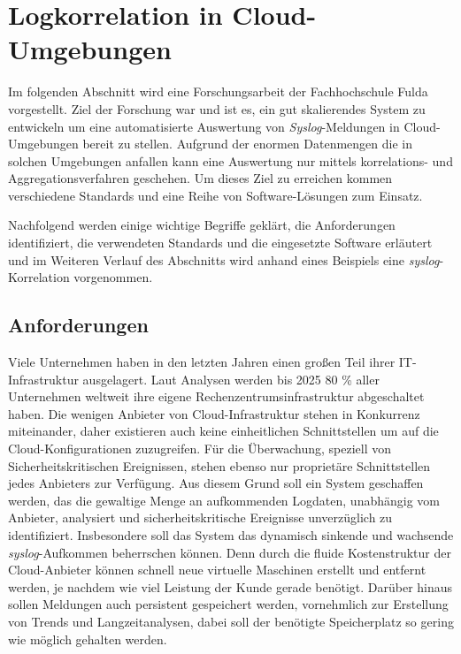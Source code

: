 \chapter{Logkorrelation in Cloud-Umgebungen}\label{02_jcorrelat}
\thispagestyle{fancy}

Im folgenden Abschnitt wird eine Forschungsarbeit der Fachhochschule Fulda 
\cite{reissmann} vorgestellt. Ziel der Forschung war und ist es, ein gut skalierendes 
System zu entwickeln um eine automatisierte Auswertung von \textit{Syslog}-Meldungen in 
Cloud-Umgebungen bereit zu stellen. Aufgrund der enormen Datenmengen die in solchen 
Umgebungen anfallen kann eine Auswertung nur mittels korrelations- und 
Aggregationsverfahren geschehen. Um dieses Ziel zu erreichen kommen verschiedene 
Standards und eine Reihe von Software-Lösungen zum Einsatz.

Nachfolgend werden einige wichtige Begriffe geklärt, die Anforderungen identifiziert, die 
verwendeten Standards und die eingesetzte Software erläutert und im Weiteren Verlauf des 
Abschnitts wird anhand eines Beispiels eine \textit{syslog}-Korrelation vorgenommen.

\section{Anforderungen}\label{anforderungen}

Viele Unternehmen haben in den letzten Jahren einen großen Teil ihrer IT-Infrastruktur 
ausgelagert. Laut Analysen werden bis 2025 80 \% aller Unternehmen \cite{web_ix} 
weltweit ihre eigene Rechenzentrumsinfrastruktur abgeschaltet haben. Die wenigen Anbieter 
von Cloud-Infrastruktur stehen in Konkurrenz miteinander, daher existieren auch keine 
einheitlichen Schnittstellen um auf die Cloud-Konfigurationen zuzugreifen. Für die 
Überwachung, speziell von Sicherheitskritischen Ereignissen, stehen ebenso nur 
proprietäre Schnittstellen jedes Anbieters zur Verfügung. Aus diesem Grund soll ein 
System geschaffen werden, das die gewaltige Menge an aufkommenden Logdaten, unabhängig 
vom Anbieter, analysiert und sicherheitskritische Ereignisse unverzüglich zu 
identifiziert. Insbesondere soll das System das dynamisch sinkende und wachsende 
\textit{syslog}-Aufkommen beherrschen können. Denn durch die fluide Kostenstruktur der 
Cloud-Anbieter können schnell neue virtuelle Maschinen erstellt und entfernt werden, je 
nachdem wie viel Leistung der Kunde gerade benötigt.
Darüber hinaus sollen Meldungen auch persistent gespeichert werden, vornehmlich zur 
Erstellung von Trends und Langzeitanalysen, dabei soll der benötigte Speicherplatz so 
gering wie möglich gehalten werden.

